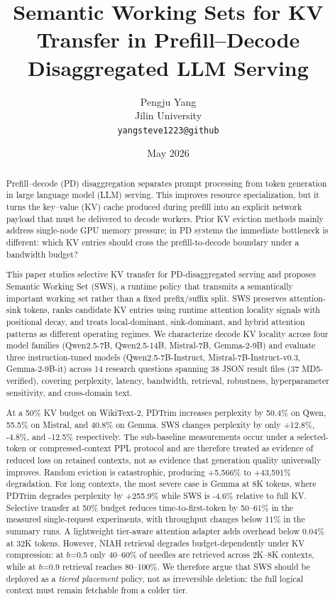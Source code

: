 \documentclass[11pt]{article}
\title{Semantic Working Sets for KV Transfer in Prefill--Decode Disaggregated LLM Serving}
\author{Pengju Yang\\
Jilin University\\
\texttt{yangsteve1223@github}}
\date{May 2026}
\newcommand{\method}{SWS}
\newcommand{\fullmethod}{Semantic Working Set}
\newcommand{\pct}{\%}
\theoremstyle{definition}
\theoremstyle{plain}
\begin{document}
\maketitle

\begin{abstract}
Prefill--decode (PD) disaggregation separates prompt processing from token generation in large language model (LLM) serving.  This improves resource specialization, but it turns the key--value (KV) cache produced during prefill into an explicit network payload that must be delivered to decode workers.  Prior KV eviction methods mainly address single-node GPU memory pressure; in PD systems the immediate bottleneck is different: which KV entries should cross the prefill-to-decode boundary under a bandwidth budget?

This paper studies selective KV transfer for PD-disaggregated serving and proposes \fullmethod{} (\method{}), a runtime policy that transmits a semantically important working set rather than a fixed prefix/suffix split.  \method{} preserves attention-sink tokens, ranks candidate KV entries using runtime attention locality signals with positional decay, and treats local-dominant, sink-dominant, and hybrid attention patterns as different operating regimes.  We characterize decode KV locality across four model families (Qwen2.5-7B, Qwen2.5-14B, Mistral-7B, Gemma-2-9B) and evaluate three instruction-tuned models (Qwen2.5-7B-Instruct, Mistral-7B-Instruct-v0.3, Gemma-2-9B-it) across 14 research questions spanning 38 JSON result files (37 MD5-verified), covering perplexity, latency, bandwidth, retrieval, robustness, hyperparameter sensitivity, and cross-domain text.

At a 50\pct{} KV budget on WikiText-2, PDTrim increases perplexity by 50.4\pct{} on Qwen, 55.5\pct{} on Mistral, and 40.8\pct{} on Gemma.  \method{} changes perplexity by only +12.8\pct{}, -4.8\pct{}, and -12.5\pct{} respectively.  The sub-baseline measurements occur under a selected-token or compressed-context PPL protocol and are therefore treated as evidence of reduced loss on retained contexts, not as evidence that generation quality universally improves.  Random eviction is catastrophic, producing +5{,}566\pct{} to +43{,}591\pct{} degradation.  For long contexts, the most severe case is Gemma at 8K tokens, where PDTrim degrades perplexity by +255.9\pct{} while \method{} is -4.6\pct{} relative to full KV.  Selective transfer at 50\pct{} budget reduces time-to-first-token by 50--61\pct{} in the measured single-request experiments, with throughput changes below 11\pct{} in the summary runs.  A lightweight tier-aware attention adapter adds overhead below 0.04\pct{} at 32K tokens.  However, NIAH retrieval degrades budget-dependently under KV compression: at $b$=0.5 only 40--60\pct{} of needles are retrieved across 2K--8K contexts, while at $b$=0.9 retrieval reaches 80--100\pct{}.  We therefore argue that \method{} should be deployed as a \emph{tiered placement} policy, not as irreversible deletion: the full logical context must remain fetchable from a colder tier.
\end{abstract}
\end{document}
